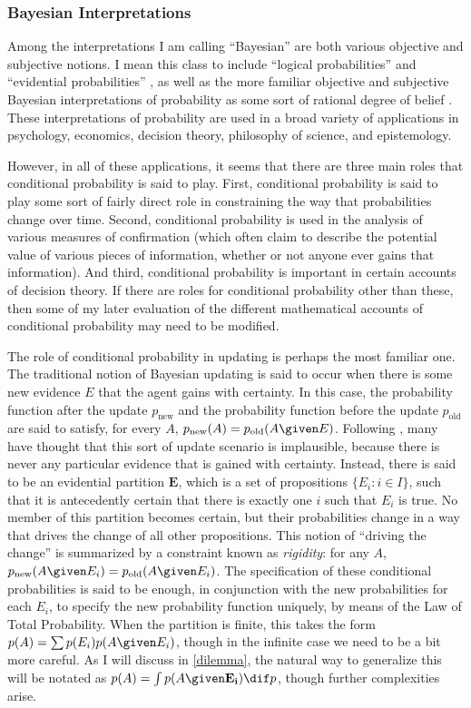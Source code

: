 \subsubsection{Bayesian Interpretations}

Among the interpretations I am calling ``Bayesian'' are both various objective and subjective notions. I mean this class to include ``logical probabilities'' \citep{keynes, carnapprob, maherconception} and ``evidential probabilities'' \citep{kail}, as well as the more familiar objective and subjective Bayesian interpretations of probability as some sort of rational degree of belief \citep{bayes1, bayes2}. These interpretations of probability are used in a broad variety of applications in psychology, economics, decision theory, philosophy of science, and epistemology.

However, in all of these applications, it seems that there are three main roles that conditional probability is said to play. First, conditional probability is said to play some sort of fairly direct role in constraining the way that probabilities change over time. Second, conditional probability is used in the analysis of various measures of confirmation (which often claim to describe the potential value of various pieces of information, whether or not anyone ever gains that information). And third, conditional probability is important in certain accounts of decision theory. If there are roles for conditional probability other than these, then some of my later evaluation of the different mathematical accounts of conditional probability may need to be modified.

The role of conditional probability in updating is perhaps the most familiar one. The traditional notion of Bayesian updating is said to occur when there is some new evidence $E$ that the agent gains with certainty. In this case, the probability function after the update $p_{\text{new}}$ and the probability function before the update $p_{\text{old}}$ are said to satisfy, for every $A$, $p_{\text{new}}(A)=p_{\text{old}}(A \given E)$. Following \citet{jeffrey}, many have thought that this sort of update scenario is implausible, because there is never any particular evidence that is gained with certainty. Instead, there is said to be an evidential partition $\mathbf{E}$, which is a set of propositions $\{E_i\colon i\in I\}$, such that it is antecedently certain that there is exactly one $i$ such that $E_i$ is true. No member of this partition becomes certain, but their probabilities change in a way that drives the change of all other propositions. This notion of ``driving the change'' is summarized by a constraint known as \textit{rigidity}: for any $A$, $p_{\text{new}}(A \given E_i)=p_{\text{old}}(A \given E_i)$. The specification of these conditional probabilities is said to be enough, in conjunction with the new probabilities for each $E_i$, to specify the new probability function uniquely, by means of the Law of Total Probability. When the partition is finite, this takes the form $p(A)=\sum p(E_i)p(A \given E_i)$, though in the infinite case we need to be a bit more careful. As I will discuss in \autoref{dilemma}, the natural way to generalize this will be notated as $p(A)=\int p(A \given \mathbf{E_i}) \dif p$, though further complexities arise.

